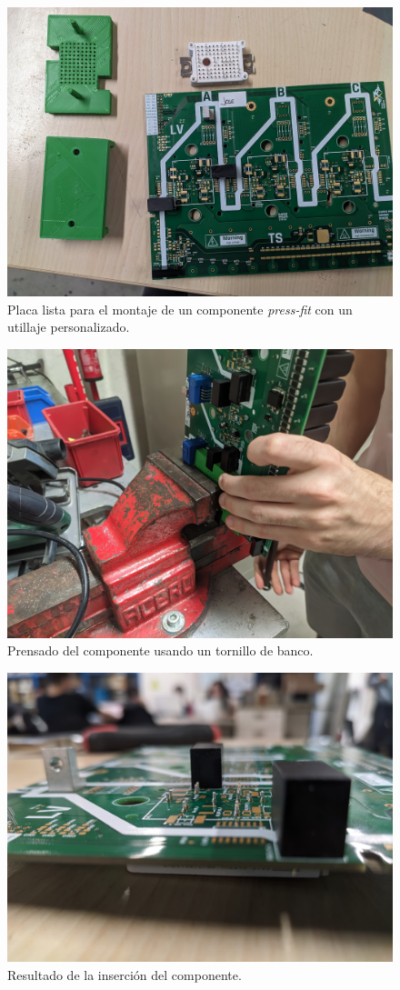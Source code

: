 \begin{figure}[H]
	\centering
	\includegraphics[width=0.7\linewidth]{fig/assembly4}
	\caption{Placa lista para el montaje de un componente \textit{press-fit} con un utillaje personalizado.}
\end{figure}

\begin{figure}[H]
	\centering
	\includegraphics[width=0.7\linewidth]{fig/tornilloBanco}
	\caption{Prensado del componente usando un tornillo de banco.}
\end{figure}

\begin{figure}[H]
	\centering
	\includegraphics[width=0.7\linewidth]{fig/assembly5}
	\caption{Resultado de la inserción del componente.}
\end{figure}


